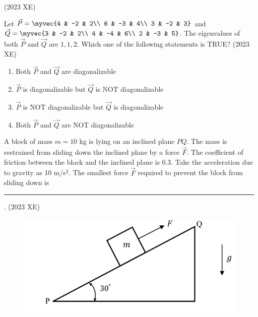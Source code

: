 \hfill(2023 XE)
\item Let  $\vec{P} = \myvec{4 & -2 & 2\\ 6 & -3 & 4\\ 3 & -2 & 3}$ and $\vec{Q} = \myvec{3 & -2 & 2\\ 4 & -4 & 6\\ 2 & -3 & 5}$.
The eigenvalues of both $\vec{P}$ and $\vec{Q}$ are $1, 1, 2$. Which one of the following
statements is TRUE?
\hfill(2023 XE)
\begin{multicols}{2}
\begin{enumerate}
\item Both $\vec{P}$ and $\vec{Q}$ are diagonalizable
\item $\vec{P}$ is diagonalizable but $\vec{Q}$ is NOT diagonalizable
\item $\vec{P}$ is NOT diagonalizable but $\vec{Q}$ is diagonalizable
\item Both $\vec{P}$ and $\vec{Q}$ are NOT diagonalizable
\end{enumerate}
\end{multicols}
\item A block of mass $m=10$ kg is lying on an inclined plane $PQ$. The mass is
restrained from sliding down the inclined plane by a force $\vec{F}$. The coefficient of
friction between the block and the inclined plane is 0.3. Take the acceleration due
to gravity as 10 m/s$^2$. The smallest force $\vec{F}$  required to prevent the block
from sliding down is \rule{1cm}{0.01pt}.
\hfill(2023 XE)
\begin{figure}[H]
\centering
\includegraphics[width=0.5\columnwidth]{GATE/2023/XE/figs/fig14.png}
\caption{}
\label{fig:figs/C/fig14.png/2023}
\end{figure}

